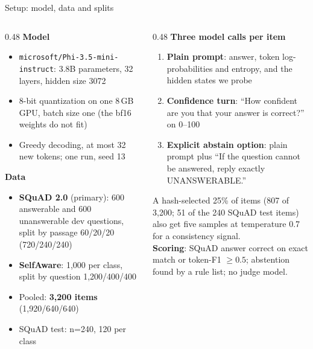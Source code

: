 \documentclass[aspectratio=169,11pt,usepdftitle=false]{beamer}
\newcommand{\code}[1]{\texttt{#1}}
\begin{document}
\begin{frame}{Setup: model, data and splits}
\scriptsize
\begin{columns}[T]
\begin{column}{0.48\textwidth}
\textbf{Model}
\begin{itemize}
\item \code{microsoft/Phi-3.5-mini-instruct}: 3.8B parameters, 32 layers, hidden size 3072
\item 8-bit quantization on one 8\,GB GPU, batch size one (the bf16 weights do not fit)
\item Greedy decoding, at most 32 new tokens; one run, seed 13
\end{itemize}
\textbf{Data}
\begin{itemize}
\item \textbf{SQuAD 2.0} (primary): 600 answerable and 600 unanswerable dev questions, split by passage 60/20/20 (720/240/240)
\item \textbf{SelfAware}: 1,000 per class, split by question 1,200/400/400
\item Pooled: \textbf{3,200 items} (1,920/640/640)
\item SQuAD test: n=240, 120 per class
\end{itemize}
\end{column}
\begin{column}{0.48\textwidth}
\textbf{Three model calls per item}
\begin{enumerate}
\item \textbf{Plain prompt}: answer, token log-probabilities and entropy, and the hidden states we probe
\item \textbf{Confidence turn}: ``How confident are you that your answer is correct?'' on 0--100
\item \textbf{Explicit abstain option}: plain prompt plus ``If the question cannot be answered, reply exactly UNANSWERABLE.''
\end{enumerate}
A hash-selected 25\% of items (807 of 3,200; 51 of the 240 SQuAD test items) also get five samples at temperature 0.7 for a consistency signal.\\[4pt]
\textbf{Scoring}: SQuAD answer correct on exact match or token-F1 $\ge 0.5$; abstention found by a rule list; no judge model.
\end{column}
\end{columns}
\end{frame}
\end{document}
